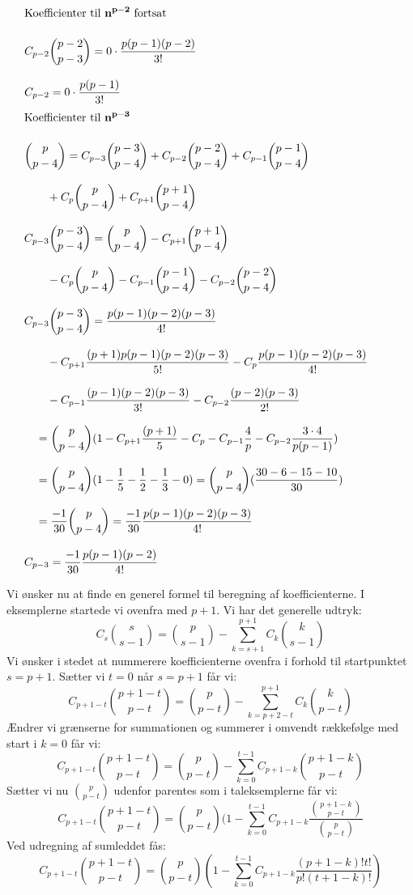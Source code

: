 \begin{align*}
&\text{Koefficienter til \(\mathbf{n^{p-2}}\) fortsat}\nylinie
&\MinLinie
&C_{p-2}\binom{p-2}{p-3}=0\cdot \frac{p(p-1)(p-2)}{3!}\nylinie
&C_{p-2}=0\cdot \frac{p(p-1)}{3!}
\end{align*}
\begin{align*}
&\text{Koefficienter til \(\mathbf{n^{p-3}}\)}\nylinie
&\MinLinie
&\binom{p}{p-4}=C_{p-3}\binom{p-3}{p-4}+C_{p-2}\binom{p-2}{p-4}+C_{p-1}\binom{p-1}{p-4}\nylinie
&\qquad +C_{p}\binom{p}{p-4}+C_{p+1}\binom{p+1}{p-4}\nylinie
&C_{p-3}\binom{p-3}{p-4}=\binom{p}{p-4}-C_{p+1}\binom{p+1}{p-4}\nylinie
&\qquad -C_{p}\binom{p}{p-4}-C_{p-1}\binom{p-1}{p-4}-C_{p-2}\binom{p-2}{p-4}\nylinie
&C_{p-3}\binom{p-3}{p-4}=\frac{p(p-1)(p-2)(p-3)}{4!} \nylinie
& \qquad -C_{p+1}\frac{(p+1)p(p-1)(p-2)(p-3)}{5!}-C_{p}\frac{p(p-1)(p-2)(p-3)}{4!} \nylinie
& \qquad -C_{p-1}\frac{(p-1)(p-2)(p-3)}{3!}-C_{p-2}\frac{(p-2)(p-3)}{2!} \nylinie
& \quad =\binom{p}{p-4}(1-C_{p+1}\frac{(p+1)}{5}-C_{p}-C_{p-1}\frac{4}{p}-C_{p-2}\frac{3 \cdot 4}{p(p-1)})\nylinie
& \quad =\binom{p}{p-4}(1-\frac{1}{5}-\frac{1}{2}-\frac{1}{3}-0)=\binom{p}{p-4}(\frac{30-6-15-10}{30})\nylinie
&\quad =\frac{-1}{30}\binom{p}{p-4}=\frac{-1}{30}\frac{p(p-1)(p-2)(p-3)}{4!}\nylinie
&C_{p-3}=\frac{-1}{30}\frac{p(p-1)(p-2)}{4!}
\end{align*}

Vi ønsker nu at finde en generel formel til beregning af koefficienterne. I eksemplerne startede vi ovenfra med \(p+1\). Vi har det generelle udtryk:
\[
C_{s}\binom{s}{s-1}=\binom{p}{s-1}-\sum_{k=s+1}^{p+1}C_{k}\binom{k}{s-1}
\]
Vi ønsker i stedet at nummerere koefficienterne ovenfra i forhold til startpunktet \(s=p+1\). Sætter vi \(t=0\) når \(s=p+1\) får vi:
\begin{equation}
C_{p+1-t}\binom{p+1-t}{p-t}=\binom{p}{p-t}-\sum_{k=p+2-t}^{p+1}C_{k}\binom{k}{p-t}
\end{equation}
Ændrer vi grænserne for summationen og summerer i omvendt rækkefølge med start i \(k=0\) får vi:
\begin{equation}
C_{p+1-t}\binom{p+1-t}{p-t}=\binom{p}{p-t}-\sum_{k=0}^{t-1}C_{p+1-k}\binom{p+1-k}{p-t}
\end{equation}
Sætter vi nu \(\binom{p}{p-t}\) udenfor parentes som i taleksemplerne får vi:
\[C_{p+1-t}\binom{p+1-t}{p-t}=\binom{p}{p-t}(1-\sum_{k=0}^{t-1}C_{p+1-k}\frac{\binom{p+1-k}{p-t}}{\binom{p}{p-t}}\]
Ved udregning af sumleddet fås:
\[C_{p+1-t}\binom{p+1-t}{p-t}=\binom{p}{p-t}(1-\sum_{k=0}^{t-1}C_{p+1-k}\frac{(p+1-k)!t!}{p!(t+1-k)!})\]

